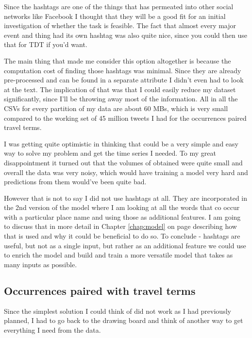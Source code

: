 \documentclass[minf,frontabs,twoside,singlespacing,parskip]{infthesis}
\begin{document}
Since the hashtags are one of the things that has permeated into other social networks like Facebook I thought that they will be a good fit for an initial investigation of whether the task is feasible. The fact that almost every major event and thing had its own hashtag was also quite nice, since you could then use that for TDT if you'd want.


The main thing that made me consider this option altogether is because the computation cost of finding those hashtags was minimal. Since they are already pre-processed and can be found in a separate attribute I didn't even had to look at the text. The implication of that was that I could easily reduce my dataset significantly, since I'll be throwing away most of the information. All in all the CSVs for every partition of my data are about 60 MBs, which is very small compared to the working set of 45 million tweets I had for the occurrences paired travel terms. 


I was getting quite optimistic  in thinking that could be a very simple and easy way to solve my problem and get the time series I needed. To my great disappointment it turned out that the volumes of obtained were quite small and overall the data was very noisy, which would have training a model very hard and predictions from them would've been quite bad. 


However that is not to say I did not use hashtags at all. They are incorporated in the 2nd version of the model where I am looking at all the words that co occur with a particular place name and using those as additional features. I am going to discuss that in more detail in Chapter \ref{chap:model} on page \pageref{chap:model} describing how that is used and why it could be beneficial to do so. To conclude - hashtags are useful, but not as a single input, but rather as an additional feature we could use to enrich the model and build and train a more versatile model that takes as many inputs as possible. 



\subsection{Occurrences paired with travel terms} 
\label{sec:tweettext}

Since the simplest solution I could think of did not work as I had previously planned, I had to go back to the drawing board and think of another way to get everything I need from the data. 
\end{document}
